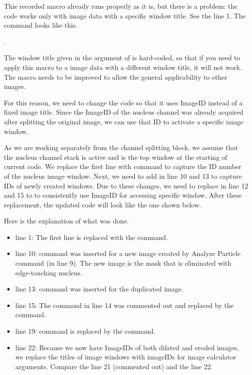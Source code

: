 

This recorded macro already runs properly as it is, but there is a problem: the code works only with image data with a specific window title. See the line 1. The command looks like this.   

. 

The window title given in the argument of  is hard-coded, so that if you need to apply this macro to a image data with a different window title, it will not work. The macro
needs to be improved to allow the general applicability to other images. 

For this reason, we need to change the code so that it uses ImageID instead of a fixed image title. Since the ImageID of the nucleus channel was already acquired after splitting the original image, we can use that ID to activate a specific image window. 

As we are working separately from the channel splitting block, we assume that the nucleus channel stack is active and is the top window at the starting of current code. We replace the first line  with  command to capture the ID number of the nucleus image window. Next, we need to add  in line 10 and 13 to capture IDs of newly created windows. Due to these changes, we need to replace  in line 12 and 15 to  to consistently use ImageID for accessing specific window. After these replacement, the updated code will look like the one shown below. 




Here is the explanation of what was done. 
\begin{itemize}
  \item line 1: The first line is replaced with the  command. 
  \item line 10:  command was inserted for a new image created by Analyze Particle command (in line 9). The new image is the mask that is eliminated with edge-touching nucleus. 
  \item line 13:  command was inserted for the duplicated image. 
  \item line 15: The  command in line 14 was commented out and replaced by the  command. 
  \item line 19:  command is replaced by the  command. 
  \item line 22: Because we now have ImageIDs of both dilated and eroded images, we replace the titles of image windows with imageIDs for image calculator arguments. Compare the line 21 (commented out) and the line 22. 
\end{itemize}

